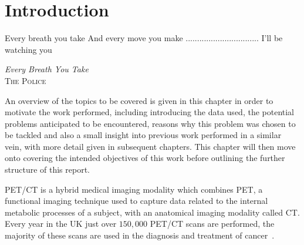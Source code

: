 \chapter{Introduction} \label{sec:introduction}
    \vspace*{\fill}
    \setlength{\epigraphwidth}{0.3\linewidth}
    \renewcommand{\epigraphflush}{flushright}
    \renewcommand{\epigraphsize}{\footnotesize}
    \epigraph{Every breath you take\newline
              And every move you make\newline
              ................................\newline
              I'll be watching you}%
              {\textit{Every Breath You Take}\\ \textsc{The Police}}
    
    \newpage
    
        An overview of the topics to be covered is given in this chapter in order to motivate the work performed, including introducing the data used, the potential problems anticipated to be encountered, reasons why this problem was chosen to be tackled and also a small insight into previous work performed in a similar vein, with more detail given in subsequent chapters. This chapter will then move onto covering the intended objectives of this work before outlining the further structure of this report.
    
        \gls{PET}/\gls{CT} is a hybrid medical imaging modality which combines \gls{PET}, a functional imaging technique used to capture data related to the internal metabolic processes of a subject, with an anatomical imaging modality called \gls{CT}. Every year in the UK just over $150,000$ \gls{PET}/\gls{CT} scans are performed, the majority of these scans are used in the diagnosis and treatment of cancer~\parencite{NHSEngland2020Diagnostic2019/20}.
    
